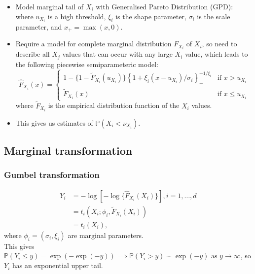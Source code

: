 \documentclass{article}
\begin{document}
\begin{itemize}
  \item Model marginal tail of $X_i$ with Generalised Pareto Distribution (GPD):
    where $u_{X_i}$ is a high threshold, $\xi_i$ is the shape parameter, $\sigma_i$ is the scale parameter, and ${x}_{+} = \max(x, 0)$.
  \item Require a model for complete marginal distribution $F_{X_i}$  of $X_i$, so need to describe all $X_j$ values that can occur with any large $X_i$ value, which leads to the following piecewise semiparameteric model:
    \[
      \hat{F}_{X_i}(x) = \begin{cases}
        1 - \{ 1 - \tilde{F}_{X_i}(u_{X_i})\} \left\{1 + \xi_i(x - u_{X_i})/\sigma_i\right\}_{+}^{-1/\xi_i} & \text{if } x > u_{X_i} \\
        \tilde{F}_{X_i}(x) & \text{if } x \le u_{X_i}
      \end{cases}
    \]
    where $\tilde{F}_{X_i}$ is the empirical distribution function of the $X_i$ values. 
  \item This gives us estimates of $\mathbb{P}(X_i < \nu_{X_i})$.
\end{itemize}

\subsection{Marginal transformation}


\subsubsection{Gumbel transformation}

\begin{align*}
  Y_i &= -\log[-\log\{\hat{F}_{X_i}(X_i)\}], i = 1, \ldots, d \\
      &= t_i(X_i; \phi_i, \tilde{F}_{X_i}(X_i)) \\
      &= t_i(X_i),
\end{align*}
where $\phi_i = (\sigma_i, \xi_i)$ are marginal parameters. \\
This gives $\mathbb{P}(Y_i \le y) = \exp(-\exp(-y)) \implies \mathbb{P}(Y_i > y) \sim \exp(-y) \text{ as } y \rightarrow \infty$, so $Y_i$ has an exponential upper tail. 
\end{document}
